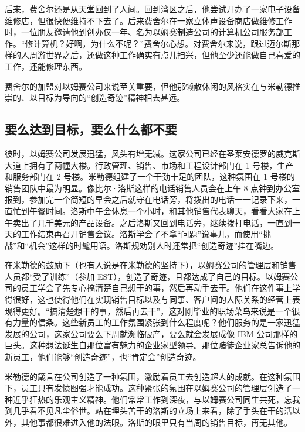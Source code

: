 \documentclass[12pt,UTF8]{ctexbook}
\begin{document}
后来，费舍尔还是从天堂回到了人间。回到湾区之后，他尝试开办了一家电子设备维修店，但很快便维持不下去了。后来费舍尔在一家立体声设备商店做维修工作时，一位朋友邀请他到创办仅一年、名为以姆赛制造公司的计算机公司服务部工作。“修计算机？好啊，为什么不呢？”费舍尔心想。对费舍尔来说，跟过迈尔斯那样的人周游世界之后，还做这种工作确实有点儿扫兴，但他至少还能做自己喜爱的工作，还能修理东西。

费舍尔的加盟对以姆赛公司来说至关重要，但他那懒散休闲的风格实在与米勒德推崇的、以目标为导向的“创造奇迹”精神相去甚远。





\subsection{要么达到目标，要么什么都不要}


彼时，以姆赛公司发展迅猛，风头有增无减。这家公司已经在圣莱安德罗的威克斯大道上拥有了两幢大楼。行政管理、销售、市场和工程设计部门在 1 号楼，生产和服务部门在 2 号楼。米勒德组建了一个干劲十足的团队，这种氛围在 1 号楼的销售团队中最为明显。像比尔·洛斯这样的电话销售人员会在上午 8 点钟到办公室报到，参加完一个简短的早会之后就守在电话旁，将拨出的电话一一记录下来，一直忙到午餐时间。洛斯中午会休息一个小时，和其他销售代表聊天，看看大家在上午卖出了几千美元的产品设备。之后洛斯又回到电话旁，继续拨打电话，一直到一天的工作结束再召开销售会议。洛斯学会了不拿“问题”说事儿，而使用“挑战”和“机会”这样的时髦用语。洛斯规劝别人时还常把“创造奇迹”挂在嘴边。

在米勒德的鼓励下（也有人说是在米勒德的坚持下），以姆赛公司的管理层和销售人员都“受了训练”（参加 EST），创造了奇迹，且都达成了自己的目标。以姆赛公司的员工学会了先专心搞清楚自己想干的事，然后再动手去干。他们在这件事上学得很好，这也使得他们在实现销售目标以及与同事、客户间的人际关系的经营上表现得更好。“搞清楚想干的事，然后再去干”，这对刚毕业的职场菜鸟来说是一个很有力量的信条。这些新员工的工作氛围紧张到什么程度呢？他们服务的是一家迅猛发展的公司，这家公司要么下周就濒临破产，要么就会发展成像 IBM 公司那样的巨头。这种想法诞生自那位富有魅力的企业家型领导。那位赌徒企业家总告诉他的新员工，他们能够“创造奇迹”，也“肯定会”创造奇迹。

米勒德的箴言在公司创造了一种氛围，激励着员工去创造超人的成就。在这种氛围下，员工只有发愤图强才能成功。这种紧张的氛围在以姆赛公司的管理层创造了一种近乎狂热的乐观主义精神。他们常常工作到深夜，与以姆赛公司同生共死，忘我到几乎看不见凡尘俗世。站在埋头苦干的洛斯的立场上来看，除了手头在干的活以外，其他事都很难进入他的法眼。洛斯的眼里只有当周的销售目标，再无其他。
\end{document}
